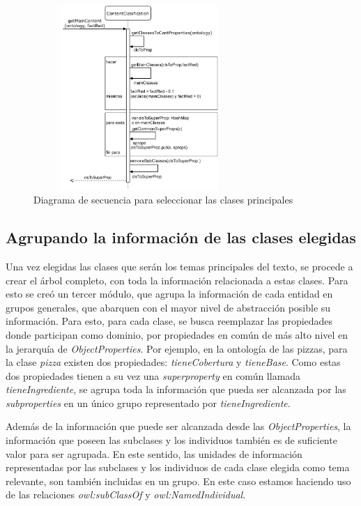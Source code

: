 \begin{figure}[H]
    \centering
    \includegraphics[width=8cm, height=7cm]{img/organizacion_informacion/secuencia_getMainContent.pdf}
    \caption{Diagrama de secuencia para seleccionar las clases principales}
    \label{fig:diagrama_secuencia_getMainContent}
\end{figure}


\subsection{Agrupando la información de las clases elegidas}
\label{sec:agrupando_info}
Una vez elegidas las clases que serán los temas principales del texto, se procede a crear el árbol completo, con toda la información relacionada a estas clases. Para esto se creó un tercer módulo, que agrupa la información de cada entidad en grupos generales, que abarquen con el mayor nivel de abstracción  posible su información. Para esto, para cada clase, se busca reemplazar las propiedades donde participan como dominio, por propiedades en común de más alto nivel en la jerarquía de \emph{ObjectProperties}. Por ejemplo, en la ontología de las pizzas, para la clase \emph{pizza} existen dos propiedades: \emph{tieneCobertura} y \emph{tieneBase}. Como estas dos propiedades tienen a su vez una \emph{superproperty} en común llamada \emph{tieneIngrediente}, se agrupa toda la información que pueda ser alcanzada por las \emph{subproperties} en un único grupo representado por \emph{tieneIngrediente}. 

Además de la información que puede ser alcanzada desde las \emph{ObjectProperties}, la información que poseen las subclases y los individuos también es de suficiente valor para ser agrupada. En este sentido, las unidades de información representadas por las subclases y los individuos de cada clase elegida como tema relevante, son también incluidas en un grupo. En este caso estamos haciendo uso de las relaciones \emph{owl:subClassOf} y \emph{owl:NamedIndividual}.

